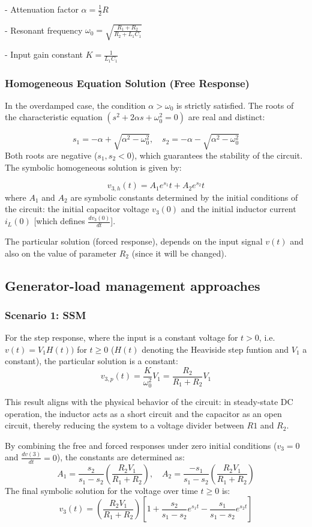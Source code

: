 \documentclass[energies,accept,oneauthor,pdftex]{Definitions/mdpi}
\begin{document}
- Attenuation factor $\alpha = \frac{1}{2} R$

- Resonant frequency $\omega_0 =\sqrt{\frac{R_1 +R_2}{R_2+L_1 C_1}}$

- Input gain constant $K = \frac{1}{L_1 C_1}$

\subsubsection*{Homogeneous Equation Solution (Free Response)}
In the overdamped case, the condition $\alpha > \omega_0$ is strictly satisfied. The  roots of the characteristic equation $(s^2 + 2\alpha s + \omega_0^2 = 0)$ are real and distinct:

\[
s_1 = -\alpha +\sqrt{\alpha^2-\omega_0^2}, \quad
s_2 = -\alpha -\sqrt{\alpha^2-\omega_0^2}
\]
Both roots are negative ($s_1 , s_2 < 0$), which guarantees the stability of the circuit. The symbolic homogeneous solution is given by:

\[
v_{3,h} (t) = A_1 e^{s_1} t + A_2 e^{s_2} t
\]
where $A_1$ and $A_2$ are symbolic constants determined by the initial conditions of the circuit: the initial capacitor voltage $v_3(0)$ and the initial inductor current $i_L (0)$ [which defines $\frac{dv_3(0)}{dt}$].

The particular solution (forced response), depends on the input signal $v(t)$ and also on the value of parameter $R_2$ (since it will be changed).

\subsection{Generator-load management approaches}

\subsubsection*{Scenario 1: SSM}
For the step response, where the input is a constant voltage for $t > 0$, i.e. $v(t) = V_1 H(t))$ for $t \ge 0$ ($H(t)$ denoting the Heaviside step funtion and $V_1$ a constant), the particular
solution is a constant:
\[
v_{3,p} (t) = \frac{K}{\omega_0^2} V_1 =\frac{R_2}{R_1 + R_2} V_1
\]

This result aligns with the physical behavior of the circuit: in steady-state DC operation, the inductor acts as a short circuit and the capacitor as an open circuit, thereby reducing the system to a voltage divider between $R1$ and $R_2$.

By combining the free and forced responses under zero initial conditions ($v_3=0$ and $\frac{dv(3)}{dt}=0$), the constants are determined as:
\[
A_1 = \frac{s_2}{s_1-s_2} \left(\frac{R_2V_1}{R_1 + R_2}\right), \quad
A_2 = \frac{-s_1}{s_1-s_2} \left(\frac{R_2V_1}{R_1 + R_2}\right)
\]
The final symbolic solution for the voltage over time $t\ge 0$ is:
\[
v_3 (t) =\left(\frac{R_2V_1}{R_1 + R_2}\right)
\left[1+\frac{s_2}{s_1-s_2}e^{s_1t}  -\frac{ s_1}{s_1-s_2}e^{s_2t} \right]
\]
\end{document}
